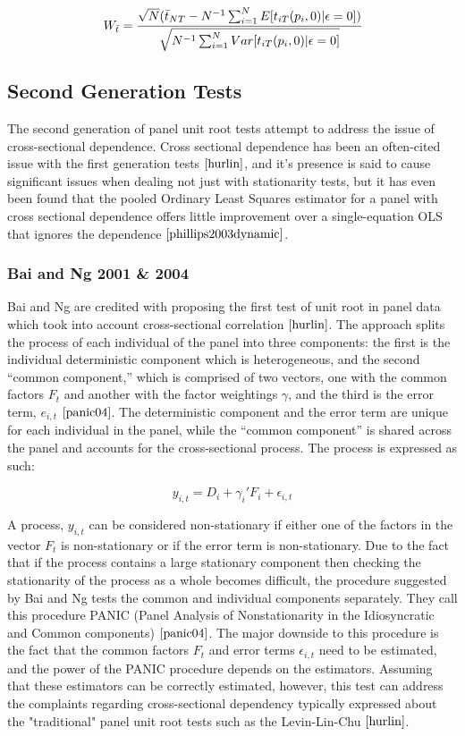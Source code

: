\begin{equation}
	W_{\bar{t}} = \cfrac{\sqrt{N}(\bar{t}_{NT}-N^{-1} \sum_{i=1}^{N}E[t_{iT}(p_i,0)|\epsilon = 0])}{\sqrt{N^{-1} \sum_{i=1}^{N}Var[t_{iT}(p_i,0)|\epsilon = 0]}}
\end{equation}

\subsection{Second Generation Tests}

The second generation of panel unit root tests attempt to address the issue of cross-sectional dependence. Cross sectional dependence has been an often-cited issue with the first generation tests $\cite{hurlin}$, and it's presence is said to cause significant issues when dealing not just with stationarity tests, but it has even been found that the pooled Ordinary Least Squares estimator for a panel with cross sectional dependence offers little improvement over a single-equation OLS that ignores the dependence $\cite{phillips2003dynamic}$.

\subsubsection{Bai and Ng 2001 \& 2004}
Bai and Ng are credited with proposing the first test of unit root in panel data which took into account cross-sectional correlation $\cite{hurlin}$. The approach splits the process of each individual of the panel into three components: the first is the individual deterministic component which is heterogeneous, and the second “common component,” which is comprised of two vectors, one with the common factors $F_t$ and another with the factor weightings $\gamma$, and the third is the error term, $e_{i,t}$ $\cite{panic04}$. The deterministic component and the error term are unique for each individual in the panel, while the “common component” is shared across the panel and accounts for the cross-sectional process. The process is expressed as such:

\begin{equation}
y_{i,t} = D_i + \gamma_i'F_i + \epsilon_{i,t}
\end{equation}

A process, $y_{i,t}$ can be considered non-stationary if either one of the factors in the vector $F_t$ is non-stationary or if the error term is non-stationary. Due to the fact that if the process contains a large stationary component then checking the stationarity of the process as a whole becomes difficult, the procedure suggested by Bai and Ng tests the common and individual components separately. They call this procedure PANIC (Panel Analysis of Nonstationarity in the Idiosyncratic and Common components) $\cite{panic04}$. The major downside to this procedure is the fact that the common factors $F_t$ and error terms $\epsilon_{i,t}$ need to be estimated, and the power of the PANIC procedure depends on the estimators. Assuming that these estimators can be correctly estimated, however, this test can address the complaints regarding cross-sectional dependency typically expressed about the "traditional" panel unit root tests such as the Levin-Lin-Chu $\cite{hurlin}$.

